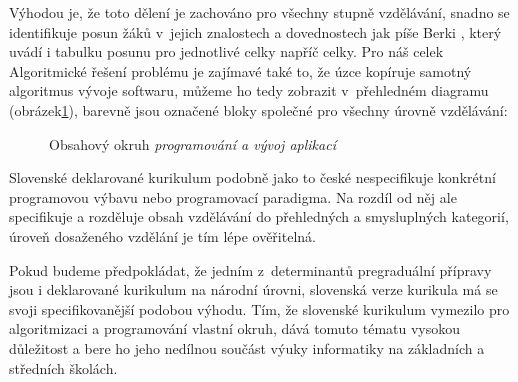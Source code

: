 \documentclass[FP,DP]{tulthesis}
\begin{document}
{{{{{{{\begin{table}[t]
\end{table}
Výhodou je, že toto dělení je zachováno pro všechny stupně vzdělávání, snadno se identifikuje posun žáků v~jejich znalostech a dovednostech jak píše Berki \citeyearpar[s.~85]{berki2016}, který uvádí i tabulku posunu pro jednotlivé celky napříč celky. Pro náš celek Algoritmické řešení problému je zajímavé také to, že úzce kopíruje samotný algoritmus vývoje softwaru, můžeme ho tedy zobrazit v~přehledném diagramu (obrázek\ref{picture1}), barevně jsou označené bloky společné pro všechny úrovně vzdělávání: 

\begin{figure}[h!]

\caption{Obsahový okruh \textit {programování a vývoj aplikací}} \label{picture1}
\end{figure}

Slovenské deklarované kurikulum podobně jako to české nespecifikuje konkrétní programovou výbavu nebo programovací paradigma. Na rozdíl od něj ale specifikuje a rozděluje obsah vzdělávání do přehledných a smysluplných kategorií, úroveň dosaženého vzdělání je tím lépe ověřitelná.
 
Pokud budeme předpokládat, že jedním z~determinantů pregraduální přípravy jsou i deklarované kurikulum na národní úrovni, slovenská verze kurikula má se svoji specifikovanější podobou výhodu. Tím, že slovenské kurikulum vymezilo pro algoritmizaci a programování vlastní okruh, dává tomuto tématu vysokou důležitost a bere ho jeho nedílnou součást výuky informatiky na základních a středních školách. 
}}}}}}}
\end{document}
